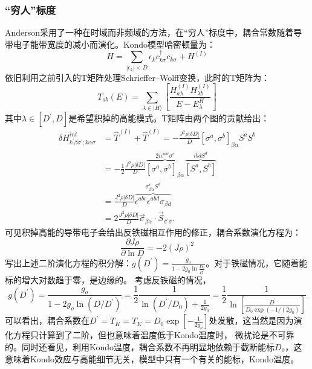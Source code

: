 \documentclass{article}
\begin{document}
\subsubsection*{“穷人”标度}
Anderson采用了一种在时域而非频域的方法，在“穷人”标度中，耦合常数随着导带电子能带宽度的减小而演化。Kondo模型哈密顿量为：
\begin{equation}
  H=\sum_{\left|\epsilon_k\right|<D} \epsilon_k c_{k \sigma}^{\dagger} c_{k \sigma}+H^{(I)}
\end{equation}
依旧利用之前引入的T矩阵处理Schrieffer–Wolff变换，此时的T矩阵为：
\begin{equation}
  T_{a b}(E)=\sum_{\lambda \in|H\rangle}\left[\frac{H_{a \lambda}^{(I)} H_{\lambda b}^{(I)}}{E-E_\lambda^H}\right]
\end{equation}
其中$ \lambda\in \left[D^{\prime}, D\right] $是希望积掉的高能模式。T矩阵由两个图的贡献给出：
\begin{equation}
  \begin{aligned}
    \delta H_{k^{\prime} \beta \sigma^{\prime} ; k \alpha \sigma}^{i n t} & =\hat{T}^{(I)}+\hat{T}^{(I)}=-\frac{J^2 \rho|\delta D|}{D}\left[\sigma^a, \sigma^b\right]_{\beta \alpha} S^a S^b \\
    & =-\frac{1}{2} \frac{J^2 \rho|\delta D|}{D} \overbrace{\left[\sigma^a, \sigma^b\right]_{\beta \alpha}}^{2 i \epsilon^{a b c} \sigma^c} \overbrace{\left[S^a, S^b\right]}^{i b d S^d} \\
    & =\frac{J^2 \rho|\delta D|}{D} \overbrace{\epsilon^{a b c} \epsilon^{a b d} \sigma_{\beta d}}^{\sigma_{\beta \alpha}^c S^d} \\
    & =2 \frac{J^2 \rho|\delta D|}{D} \vec{\sigma}_{\beta \alpha} \cdot \vec{S}_{\sigma^{\prime} \sigma} .
    \end{aligned}
\end{equation}
可见积掉高能的导带电子会给出反铁磁相互作用的修正，耦合系数演化方程为：
\begin{equation}
  \frac{\partial J \rho}{\partial \ln D}=-2(J \rho)^2
\end{equation}
写出上述二阶演化方程的积分解：$ g\left(D^{\prime}\right)=\frac{g_0}{1-2 g_0 \ln \frac{D_0}{D^{\prime}}} $。对于铁磁情况，它随着能标的增大对数趋于零，是边缘的。 考虑反铁磁的情况，
\begin{equation}
  g\left(D^{\prime}\right)=\frac{g_o}{1-2 g_o \ln \left(D / D^{\prime}\right)}=\frac{1}{2} \frac{1}{\ln \left(D^{\prime} / D_0\right)+\frac{1}{2 g_0}}=\frac{1}{2} \frac{1}{\ln \left[\frac{D^{\prime}}{D_0 \exp \left(-1 /\left(2 g_0\right)\right.}\right]}
\end{equation}
可以看出，耦合系数在$ D^{\prime}=T_K=T_K=D_0 \exp \left[-\frac{1}{2 g_o}\right] $处发散，这当然是因为演化方程只计算到了二阶，但也意味着温度低于Kondo温度时，
微扰论是不可靠的。同时还看见，利用Kondo温度，耦合系数不再明显地依赖于截断能标$ D_0 $，这意味着Kondo效应与高能细节无关，模型中只有一个有关的能标，Kondo温度。\\
\end{document}
